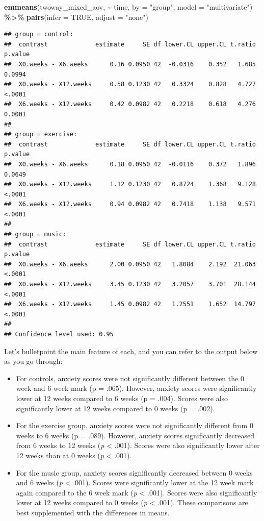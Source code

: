 \documentclass[
]{book}
\newenvironment{Shaded}{\begin{snugshade}}{\end{snugshade}}
\newcommand{\AttributeTok}[1]{\textcolor[rgb]{0.13,0.29,0.53}{#1}}
\newcommand{\ConstantTok}[1]{\textcolor[rgb]{0.56,0.35,0.01}{#1}}
\newcommand{\FunctionTok}[1]{\textcolor[rgb]{0.13,0.29,0.53}{\textbf{#1}}}
\newcommand{\NormalTok}[1]{#1}
\newcommand{\SpecialCharTok}[1]{\textcolor[rgb]{0.81,0.36,0.00}{\textbf{#1}}}
\newcommand{\StringTok}[1]{\textcolor[rgb]{0.31,0.60,0.02}{#1}}
\providecommand{\tightlist}{%
  \setlength{\itemsep}{0pt}\setlength{\parskip}{0pt}}
\begin{document}
\begin{Shaded}
\begin{Highlighting}[]
\FunctionTok{emmeans}\NormalTok{(twoway\_mixed\_aov, }\SpecialCharTok{\textasciitilde{}}\NormalTok{ time, }\AttributeTok{by =} \StringTok{"group"}\NormalTok{, }\AttributeTok{model =} \StringTok{"multivariate"}\NormalTok{) }\SpecialCharTok{\%\textgreater{}\%}
  \FunctionTok{pairs}\NormalTok{(}\AttributeTok{infer =} \ConstantTok{TRUE}\NormalTok{, }\AttributeTok{adjust =} \StringTok{"none"}\NormalTok{)}
\end{Highlighting}
\end{Shaded}

\begin{verbatim}
## group = control:
##  contrast             estimate     SE df lower.CL upper.CL t.ratio p.value
##  X0.weeks - X6.weeks      0.16 0.0950 42  -0.0316    0.352   1.685  0.0994
##  X0.weeks - X12.weeks     0.58 0.1230 42   0.3324    0.828   4.727  <.0001
##  X6.weeks - X12.weeks     0.42 0.0982 42   0.2218    0.618   4.276  0.0001
## 
## group = exercise:
##  contrast             estimate     SE df lower.CL upper.CL t.ratio p.value
##  X0.weeks - X6.weeks      0.18 0.0950 42  -0.0116    0.372   1.896  0.0649
##  X0.weeks - X12.weeks     1.12 0.1230 42   0.8724    1.368   9.128  <.0001
##  X6.weeks - X12.weeks     0.94 0.0982 42   0.7418    1.138   9.571  <.0001
## 
## group = music:
##  contrast             estimate     SE df lower.CL upper.CL t.ratio p.value
##  X0.weeks - X6.weeks      2.00 0.0950 42   1.8084    2.192  21.063  <.0001
##  X0.weeks - X12.weeks     3.45 0.1230 42   3.2057    3.701  28.144  <.0001
##  X6.weeks - X12.weeks     1.45 0.0982 42   1.2551    1.652  14.797  <.0001
## 
## Confidence level used: 0.95
\end{verbatim}

Let's bulletpoint the main feature of each, and you can refer to the output below as you go through:

\begin{itemize}
\tightlist
\item
  For controls, anxiety scores were not significantly different between the 0 week and 6 week mark (p = .065). However, anxiety scores were significantly lower at 12 weeks compared to 6 weeks (p = .004). Scores were also significantly lower at 12 weeks compared to 0 weeks (p = .002).
\item
  For the exercise group, anxiety scores were not significantly different from 0 weeks to 6 weeks (p = .089). However, anxiety scores significantly decreased from 6 weeks to 12 weeks (\emph{p} \textless{} .001). Scores were also significantly lower after 12 weeks than at 0 weeks (\emph{p} \textless{} .001).
\item
  For the music group, anxiety scores significantly decreased between 0 weeks and 6 weeks (\emph{p} \textless{} .001). Scores were significantly lower at the 12 week mark again compared to the 6 week mark (\emph{p} \textless{} .001). Scores were also significantly lower at 12 weeks compared to 0 weeks (\emph{p} \textless{} .001). These comparisons are best supplemented with the differences in means.
\end{itemize}
\end{document}
